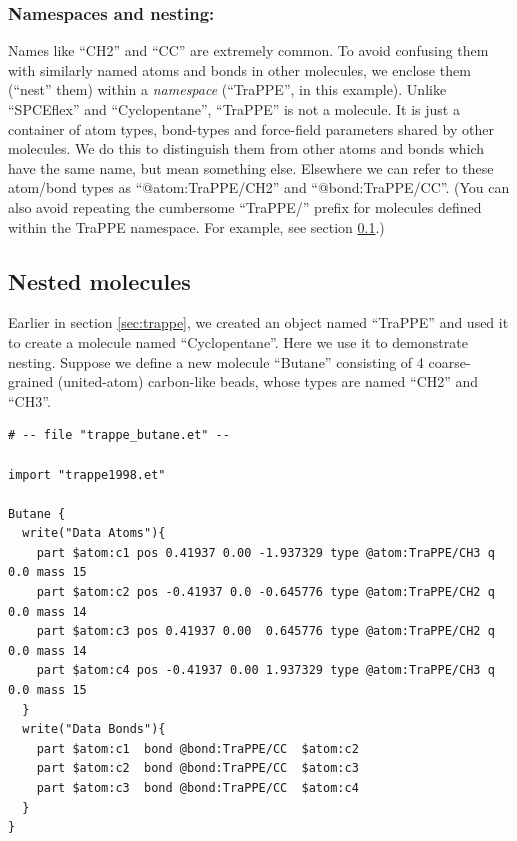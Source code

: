 \documentclass[11pt]{article}
\begin{document}
\subsubsection*{Namespaces and nesting:}
Names like ``CH2'' and ``CC'' are extremely common.
To avoid confusing them with similarly named atoms and bonds 
in other molecules, we enclose them (``nest'' them) within a 
\textit{namespace} (``TraPPE'', in this example).
Unlike ``SPCEflex'' and ``Cyclopentane'', ``TraPPE'' is not a molecule.
It is just a container of atom types, bond-types and 
force-field parameters shared by other molecules.
We do this to distinguish them from other atoms and bonds 
which have the same name, but mean something else.
Elsewhere we can refer to these atom/bond types as
``@atom:TraPPE/CH2'' and ``@bond:TraPPE/CC''.
(You can also avoid repeating the cumbersome ``TraPPE/'' prefix 
 for molecules defined within the TraPPE namespace.
 For example, see section \ref{sec:butane}.)





\subsection{Nested molecules}
\label{sec:butane}
Earlier in section \ref{sec:trappe}, we created an object named ``TraPPE''
and used it to create a molecule named ``Cyclopentane''.
Here we use it to demonstrate nesting.
Suppose we define a new molecule ``Butane'' consisting of 4 coarse-grained
(united-atom) carbon-like beads, whose types are named ``CH2'' and ``CH3''.
\begin{verbatim}
# -- file "trappe_butane.et" --

import "trappe1998.et"

Butane {
  write("Data Atoms"){
    part $atom:c1 pos 0.41937 0.00 -1.937329 type @atom:TraPPE/CH3 q 0.0 mass 15
    part $atom:c2 pos -0.41937 0.0 -0.645776 type @atom:TraPPE/CH2 q 0.0 mass 14
    part $atom:c3 pos 0.41937 0.00  0.645776 type @atom:TraPPE/CH2 q 0.0 mass 14
    part $atom:c4 pos -0.41937 0.00 1.937329 type @atom:TraPPE/CH3 q 0.0 mass 15
  }
  write("Data Bonds"){
    part $atom:c1  bond @bond:TraPPE/CC  $atom:c2
    part $atom:c2  bond @bond:TraPPE/CC  $atom:c3
    part $atom:c3  bond @bond:TraPPE/CC  $atom:c4
  }
}
\end{verbatim}
\end{document}
